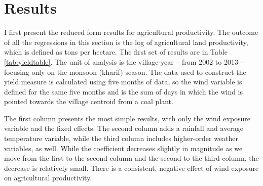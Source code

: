 \documentclass[
]{article}
\begin{document}
\hypertarget{results}{%
\section{Results}\label{results}}

\label{results}

I first present the reduced form results for agricultural productivity. The outcome of all the regressions in this section is the log of agricultural land productivity, which is defined as tons per hectare. The first set of results are in Table \ref{tab:yieldtable}. The unit of analysis is the village-year -- from 2002 to 2013 -- focusing only on the monsoon (kharif) season. The data used to construct the yield measure is calculated using five months of data, so the wind variable is defined for the same five months and is the sum of days in which the wind is pointed towards the village centroid from a coal plant.

The first column presents the most simple results, with only the wind exposure variable and the fixed effects. The second column adds a rainfall and average temperature variable, while the third column includes higher-order weather variables, as well. While the coefficient decreases slightly in magnitude as we move from the first to the second column and the second to the third column, the decrease is relatively small. There is a consistent, negative effect of wind exposure on agricultural productivity.
\end{document}
